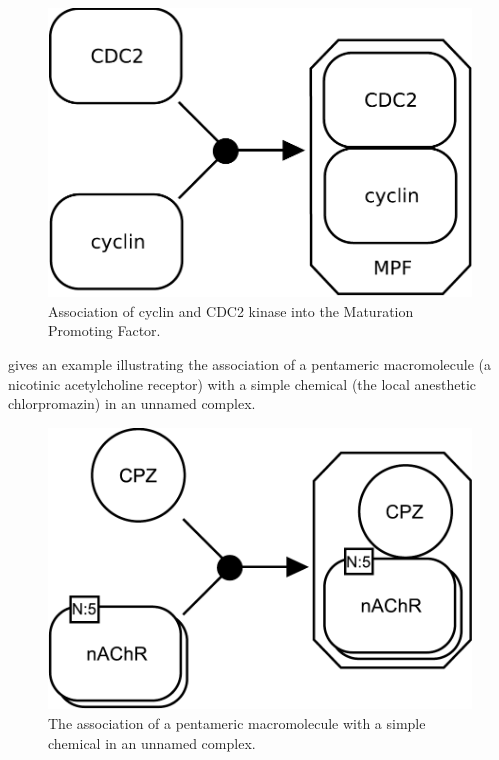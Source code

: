\begin{figure}[H]
  \centering
  \includegraphics[scale = 0.3]{examples/association-MPF}
  \caption{Association of cyclin and CDC2 kinase into the Maturation Promoting Factor.}
  \label{fig:assoc-cyclin}
\end{figure}

 gives an example illustrating the association of a pentameric macromolecule (a nicotinic acetylcholine receptor) with a simple chemical (the local anesthetic chlorpromazin) in an unnamed complex.

\begin{figure}[H]
  \centering
  \includegraphics[scale = 0.3]{examples/association-unamed}
  \caption{The association of a pentameric macromolecule with a simple chemical in an unnamed complex.}
  \label{fig:assoc-unamed}
\end{figure}

